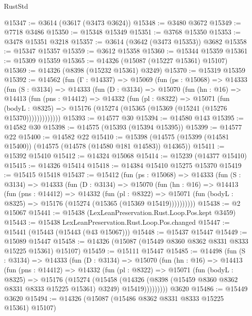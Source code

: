 \begin{lexlean}{RustStd}
\begin{coremodule}
@15347 := @3614 (@3617 (@3473 @3624))
@15348 := @3480 @3672
@15349 := @7718 @3486
@15350 := @15348 @15349
@15351 := @3768 @15350
@15353 := @3478 @15351 @3218
@15357 := @3614 (@3642 (@3473 @15353)) @3682
@15358 := @15347 @15357
@15359 := @3612 @15358
@15360 := @15344 @15359
@15361 := @15309 @15359
@15365 := @14326 (@15087 (@15227 @15361) @15107)
@15369 := @14326 (@8398 (@15232 @15361) @3249)
@15370 := @15319 @15359
@15392 := @14562
    (fun (Γ : @14337) =>
    @15069
      (fun (ps : @15068) =>
      @14333
        (fun (S : @3134) =>
        @14333
          (fun (D : @3134) =>
          @15070
            (fun (hn : @16) =>
            @14413
              (fun (pns : @14412) =>
              @14332
                (fun (pl : @8322) =>
                @15071
                  (fun (bodyL : @8325) =>
                  @15176 (@15274 (@15365 (@15369 (@15241 (@15276 @15370)))))))))))))
@15393 := @14577 @30
@15394 := @14580 @143
@15395 := @14582 @30
@15398 := @14575 (@15393 (@15394 @15395))
@15399 := @14577 @22
@15400 := @14582 @22
@15410 := @15398 (@14575 (@15399 (@14581 @15400)) (@14575 (@14578 (@14580 @181 @14583)) @14365))
@15411 := @15392 @15410
@15412 := @14324 @15068
@15414 := @15239 (@14377 @15410)
@15415 := @14326 @15414
@15418 := @14384 @15410 @15275 @15370
@15419 := @15415 @15418
@15437 := @15412
    (fun (ps : @15068) =>
    @14333
      (fun (S : @3134) =>
      @14333
        (fun (D : @3134) =>
        @15070
          (fun (hn : @16) =>
          @14413
            (fun (pns : @14412) =>
            @14332
              (fun (pl : @8322) =>
              @15071 (fun (bodyL : @8325) => @15176 (@15274 (@15365 (@15369 @15419))))))))))
@15438 := @2 @15067
@15441 := @15438 (LexLeanPreservation.Rust.Loop.Pos.kept @3459)
@15443 := @15438 LexLeanPreservation.Rust.Loop.Pos.changed
@15447 := @15441 (@15443 (@15443 (@43 @15067)))
@15448 := @15437 @15447
@15449 := @15089 @15447
@15458 := @14326 (@15087 (@15449 @8360 @8362 @8331 @8333 @15225 @15361) @15107)
@15459 := @15111 @15447
@15485 := @14498
    (fun (S : @3134) =>
    @14333
      (fun (D : @3134) =>
      @15070
        (fun (hn : @16) =>
        @14413
          (fun (pns : @14412) =>
          @14332
            (fun (pl : @8322) =>
            @15071
              (fun (bodyL : @8325) =>
              @15176
                (@15274
                  (@15458
                    (@14326
                      (@8398 (@15459 @8360 @8362 @8331 @8333 @15225 @15361) @3249)
                      @15419)))))))))
    @3620
@15486 := @15449 @3620
@15494 := @14326 (@15087 (@15486 @8362 @8331 @8333 @15225 @15361) @15107)

\end{coremodule}
\end{lexlean}
